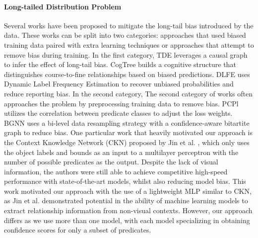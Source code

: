 \documentclass{article}
\begin{document}
\paragraph{Long-tailed Distribution Problem}
Several works have been proposed to mitigate the long-tail bias introduced by the data\cite{tang2020unbiased,yu2020cogtree,chiou2021recovering,jin2023fast}. These works can be split into two categories: approaches that used biased training data paired with extra learning techniques or approaches that attempt to remove bias during training.
In the first category, TDE\cite{tang2020unbiased} leverages a causal graph to infer the effect of long-tail bias. CogTree\cite{yu2020cogtree} builds a cognitive structure that distinguishes course-to-fine relationships based on biased predictions. DLFE\cite{chiou2021recovering} uses Dynamic Label Frequency Estimation to recover unbiased probabilities and reduce reporting bias. In the second category, 
The second category of works often approaches the problem by preprocessing training data to remove bias. PCPl\cite{yan2020pcpl} utilizes the correlation between predicate classes to adjust the loss weights. BGNN\cite{li2021bipartite} uses a bi-level data resampling strategy with a confidence-aware bitartite graph to reduce bias. 
One particular work that heavily motivated our approach is the Context Knowledge Network (CKN) proposed by Jin et al. \cite{jin2023fast}, which only uses the object labels and bounds as an input to a multilayer perceptron with the number of possible predicates as the output. Despite the lack of visual information, the authors were still able to achieve competitive high-speed performance with state-of-the-art models, whilst also reducing model bias.
This work motivated our approach with the use of a lightweight MLP similar to CKN, as Jin et al. demonstrated potential in the ability of machine learning models to extract relationship information from non-visual contexts\cite{jin2023fast}. However, our approach differs as we use more than one model, with each model specializing in obtaining confidence scores for only a subset of predicates.
\end{document}
